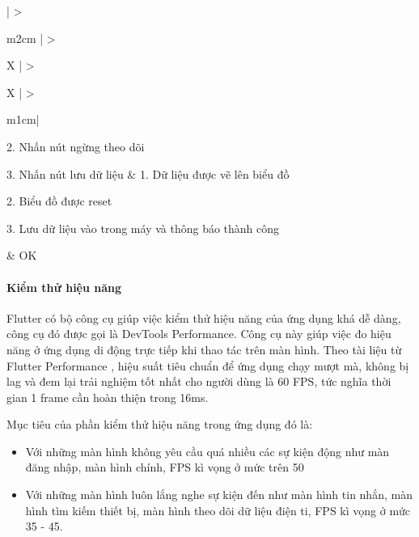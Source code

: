 \begin{enumerate}[a)]
\begin{xltabular}{\textwidth}{
    | >{\raggedright\arraybackslash}m{2cm}
    | >{\raggedright\arraybackslash}X
    | >{\raggedright\arraybackslash}X
    | >{\raggedright\arraybackslash}m{1cm}|
    }
      2. Nhấn nút ngừng theo dõi

      3. Nhấn nút lưu dữ liệu
    & 
      1. Dữ liệu được vẽ lên biểu đồ

      2. Biểu đồ được reset

      3. Lưu dữ liệu vào trong máy và thông báo thành công
  
    & OK
    \\ \hline
    \end{xltabular}
  
\end{enumerate}

\paragraph{Kiểm thử hiệu năng}
\mbox{}

Flutter có bộ công cụ giúp việc kiểm thử hiệu năng của ứng dụng khá dễ dàng, công cụ đó được gọi là DevTools Performance.
Công cụ này giúp việc đo hiệu năng ở ứng dụng di động trực tiếp khi thao tác trên màn hình. Theo tài liệu từ Flutter Performance
\cite{flutter_performance}, hiệu suất tiêu chuẩn để ứng dụng chạy mượt mà, không bị lag và đem lại trải nghiệm tốt nhất
cho người dùng là 60 FPS, tức nghĩa thời gian 1 frame cần hoàn thiện trong 16ms. 

Mục tiêu của phần kiểm thử hiệu năng trong ứng dụng đó là:
\begin{itemize}
  \item Với những màn hình không yêu cầu quá nhiều các sự kiện động như màn đăng nhập, màn hình chính, FPS kì vọng ở mức trên 50
  \item Với những màn hình luôn lắng nghe sự kiện đến như màn hình tin nhắn, màn hình tìm kiếm thiết bị, màn hình theo dõi
    dữ liệu điện ti, FPS kì vọng ở mức 35 - 45. 
\end{itemize}

